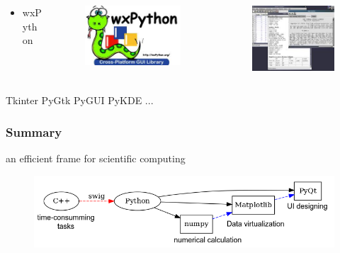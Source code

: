\documentclass[compress=true]{beamer}
\begin{document}
\begin{frame}
\begin{columns}
\begin{column}{0.2\textwidth}
			\begin{itemize}
				\item wxPython
			\end{itemize}
		\end{column}
		\begin{column}{0.4\textwidth}
			\begin{figure}
				\includegraphics[height=0.3\textheight]{wxPython.png}
			\end{figure}
		\end{column}
		\begin{column}{0.4\textwidth}
			\begin{figure}
				\includegraphics[height=0.3\textheight]{wxpython_1.png}\\
			\end{figure}
		\end{column}
	\end{columns}
	\begin{flushleft}
	Tkinter PyGtk PyGUI PyKDE ...
\end{flushleft}
\end{frame}
\begin{frame}
	\frametitle{Summary}
	an efficient frame for scientific computing
	\begin{figure}
		\includegraphics[height=0.3\textheight]{summary.png}
	\end{figure}
\end{frame}
\end{document}
